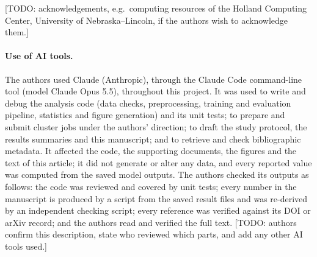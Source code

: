 [TODO: acknowledgements, e.g.\ computing resources of the Holland Computing Center, University of Nebraska--Lincoln, if the
authors wish to acknowledge them.]

\paragraph*{Use of AI tools.}
The authors used Claude (Anthropic), through the Claude Code command-line tool (model Claude Opus 5.5), throughout this
project. It was used to write and debug the analysis code (data checks, preprocessing, training and evaluation pipeline,
statistics and figure generation) and its unit tests; to prepare and submit cluster jobs under the authors' direction;
to draft the study protocol, the results summaries and this manuscript; and to retrieve and check bibliographic metadata.
It affected the code, the supporting documents, the figures and the text of this article; it did not generate or alter
any data, and every reported value was computed from the saved model outputs. The authors checked its outputs as
follows: the code was reviewed and covered by unit tests; every number in the manuscript is produced by a script from the
saved result files and was re-derived by an independent checking script; every reference was verified against its DOI or
arXiv record; and the authors read and verified the full text. [TODO: authors confirm this description, state who
reviewed which parts, and add any other AI tools used.]
